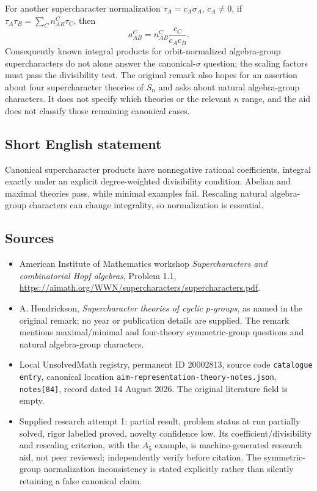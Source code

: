 \documentclass[11pt]{article}
\begin{document}
For another supercharacter normalization $\tau_A=c_A\sigma_A$, $c_A\ne0$, if $\tau_A\tau_B=\sum_C n_{AB}^{C}\tau_C$, then
\[
 a_{AB}^{C}=n_{AB}^{C}\frac{c_C}{c_Ac_B}.
\]
Consequently known integral products for orbit-normalized algebra-group supercharacters do not alone answer the canonical-$\sigma$ question; the scaling factors must pass the divisibility test. The original remark also hopes for an assertion about four supercharacter theories of $S_n$ and asks about natural algebra-group characters. It does not specify which theories or the relevant $n$ range, and the aid does not classify those remaining canonical cases.
\subsection{Short English statement}
Canonical supercharacter products have nonnegative rational coefficients, integral exactly under an explicit degree-weighted divisibility condition. Abelian and maximal theories pass, while minimal examples fail. Rescaling natural algebra-group characters can change integrality, so normalization is essential.
\subsection{Sources}
\begin{itemize}
\item American Institute of Mathematics workshop \emph{Supercharacters and combinatorial Hopf algebras}, Problem 1.1, \url{https://aimath.org/WWN/supercharacters/supercharacters.pdf}.
\item A. Hendrickson, \emph{Supercharacter theories of cyclic $p$-groups}, as named in the original remark; no year or publication details are supplied. The remark mentions maximal/minimal and four-theory symmetric-group questions and natural algebra-group characters.
\item Local UnsolvedMath registry, permanent ID 20002813, source code \texttt{catalogue entry}, canonical location \texttt{aim-representation-theory-notes.json}, \texttt{notes[84]}, record dated 14 August 2026. The original literature field is empty.
\item Supplied research attempt 1: partial result, problem status at run partially solved, rigor labelled proved, novelty confidence low. Its coefficient/divisibility and rescaling criterion, with the $A_5$ example, is machine-generated research aid, not peer reviewed; independently verify before citation. The symmetric-group normalization inconsistency is stated explicitly rather than silently retaining a false canonical claim.
\end{itemize}
\end{document}
